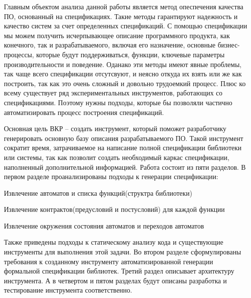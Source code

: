 Главным объектом анализа данной работы является метод опеспечения качества ПО, основанный на спецификациях.
Такие методы гарантируют надежность и качество систем за счет определенных спецификаций.
С помощью спецификации мы можем получить исчерпывающее описание программного продукта, как конечного, так и разрабатываемого, включая его назначение, основные бизнес-процессы, которые будут поддерживаться, функции, ключевые параметры производительности и поведение.
Оданако эти методы имеют явные проблемы, так чаще всего спецификации отсутсвуют, и неясно откуда их взять или же как построить, так как это очень сложный и довольно трудоемкий процесс.
Плюс ко всему существует ряд экспериментальных инструментов, работающих со спецификациями.
Поэтому нужны подходы, которые бы позволяли частично автоматизировать процесс построения спецификаций.

Основная цель ВКР – создать инструмент, который поможет разработчику генерировать основную базу описания разрабатываемого ПО. Такой инструмент сократит время, затрачиваемое на написание полной спецификации библиотеки или системы, так как позволит создать необходимый каркас спецификации, наполненный дополнительной информацией.
Работа состоит из пяти разделов. В первом разделе проанализированы подходы к генерации спецификации:
%
\begin{itemize*}
\item Извлечение автоматов и списка функций(структра библиотеки)
\item Извлечение контрактов(предусловий и постусловий) для каждой функции
\item Извлечение окружения состояния автоматов и переходов автоматов
\end{itemize*}
%

Также приведены подходы к статическому анализу кода и существующие инструменты для выполнения этой задачи. Во втором разделе сформулированы требования к созданному инструменту автоматизированной генерации формальной спецификации библиотек. Третий раздел описывает архитектуру инструмента. А в четвертом и пятом разделах будут описаны разработка и тестирование инструмента соответственно.
